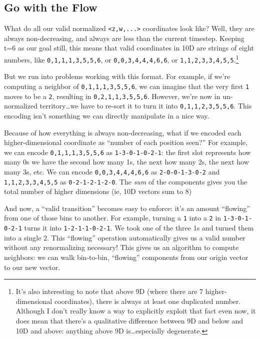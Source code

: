 \documentclass[]{article}
\begin{document}
\hypertarget{go-with-the-flow}{%
\subsection{Go with the Flow}\label{go-with-the-flow}}

What do all our valid normalized \texttt{\textless{}z,w,...\textgreater{}}
coordinates look like? Well, they are always non-decreasing, and always are less
than the current timestep. Keeping t=6 as our goal still, this means that valid
coordinates in 10D are strings of eight numbers, like \texttt{0,1,1,1,3,5,5,6},
or \texttt{0,0,3,4,4,4,6,6}, or \texttt{1,1,2,3,3,4,5,5}.\footnote{It's also
  interesting to note that above 9D (where there are 7 higher-dimensional
  coordinates), there is always at least one duplicated number. Although I don't
  really know a way to explicitly exploit that fact even now, it does mean that
  there's a qualitative difference between 9D and below and 10D and above:
  anything above 9D is\ldots especially degenerate.}

But we run into problems working with this format. For example, if we're
computing a neighbor of \texttt{0,1,1,1,3,5,5,6}, we can imagine that the very
first \texttt{1} moves to be a \texttt{2}, resulting in
\texttt{0,2,1,1,3,5,5,6}. However, we're now in un-normalized territory\ldots we
have to re-sort it to turn it into \texttt{0,1,1,2,3,5,5,6}. This encoding isn't
something we can directly manipulate in a nice way.

Because of how everything is always non-decreasing, what if we encoded each
higher-dimensional coordinate as ``number of each position seen?'' For example,
we can encode \texttt{0,1,1,1,3,5,5,6} as \texttt{1-3-0-1-0-2-1}: the first slot
represents how many 0s we have the second how many 1s, the next how many 2s, the
next how many 3s, etc. We can encode \texttt{0,0,3,4,4,4,6,6} as
\texttt{2-0-0-1-3-0-2} and \texttt{1,1,2,3,3,4,5,5} as \texttt{0-2-1-2-1-2-0}.
The \emph{sum} of the components gives you the total number of higher dimensions
(ie, 10D vectors sum to 8)

And now, a ``valid transition'' becomes easy to enforce: it's an amount
``flowing'' from one of those bins to another. For example, turning a \texttt{1}
into a \texttt{2} in \texttt{1-3-0-1-0-2-1} turns it into
\texttt{1-2-1-1-0-2-1}. We took one of the three 1s and turned them into a
single 2. This ``flowing'' operation automatically gives us a valid number
without any renormalizing necessary! This gives us an algorithm to compute
neighbors: we can walk bin-to-bin, ``flowing'' components from our origin vector
to our new vector.
\end{document}
